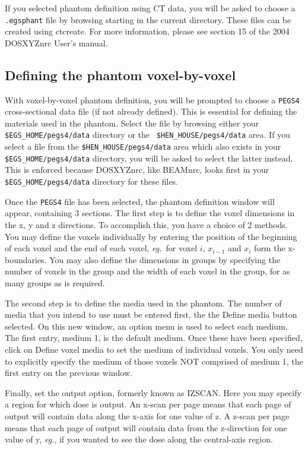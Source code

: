 \documentclass[12pt,twoside]{article}
\newcommand{\eg}{{\em eg.}}
\begin{document}
If you selected phantom definition using CT data, you will be asked to
choose a {\tt .egsphant} file by browsing starting in the current
directory.  These
files can be created using ctcreate.  For more information, please see
section 15 of the 2004 DOSXYZnrc User's manual\cite{WR04a}.

\subsection{Defining the phantom voxel-by-voxel}

With voxel-by-voxel phantom definition, you will be prompted
to choose a {\tt PEGS4} cross-sectional data file (if not already
defined).  This is essential
for defining the materials used in the phantom.  Select the file by
browsing either your {\tt \$EGS\_HOME/pegs4/data} directory or the {\tt
\$HEN\_HOUSE/pegs4/data} area.  If you
select a file from the {\tt \$HEN\_HOUSE/pegs4/data} area which also
exists in your {\tt \$EGS\_HOME/pegs4/data}
directory, you will be asked to select the latter instead.  This is
enforced because DOSXYZnrc, like BEAMnrc, looks first in your {\tt
\$EGS\_HOME/pegs4/data} directory for these files.

Once the {\tt PEGS4} file has been selected, the phantom definition
window will appear, containing 3 sections.  The first step is to define
the voxel dimensions in the x, y and z directions.  To accomplish this,
you have a choice of 2 methods.  You may define the voxels individually
by entering the position of the beginning of each voxel and the end of
each voxel, \eg~for voxel $i$, $x_{i-1}$ and $x_i$ form the
x-boundaries.  You may also define the dimensions in groups by
specifying the number of voxels in the group and the width of each voxel
in the group, for as many groups as is required.

The second step is to define the media used in the phantom.  The number
of media that you intend to use must be entered first, the the {\sf
Define media} button selected.  On this new window, an option menu is
used to select each medium.  The first entry,
medium 1, is the default medium.  Once these have been specified, click
on {\sf Define voxel media} to set the medium of individual voxels.  You
only need to explicitly specify the medium of those voxels NOT comprised
of medium 1, the first entry on the previous window.

Finally, set the output option, formerly known as IZSCAN.  Here you may
specify a region for which dose is output.  An x-scan per page means
that each page of output will contain data along the x-axis for one
value of z.  A z-scan
per page means that each page of output will contain data from the
z-direction for one value of y, \eg, if you wanted to see the dose along
the central-axis region.
\end{document}
